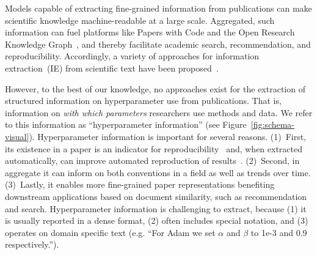 
Models capable of extracting fine-grained information from publications can make scientific knowledge machine-readable at a large scale.
Aggregated, such information can fuel platforms like Papers with Code and the Open Research Knowledge Graph~\cite{orkg1,orkg2}, and thereby facilitate academic search, recommendation,  and reproducibility.
Accordingly, a variety of approaches for information extraction~(IE) from scientific text have been proposed~\cite{luan2018scierc,Jain2020scirex,semeval21_task8,semeval22_task12,Dunn2022}.  %


However, to the best of our knowledge, no approaches exist for the extraction of structured information on hyperparameter use from publications.
That is, information on \emph{with which parameters} researchers use methods and data. We refer to this information as ``hyperparameter information'' (see Figure~\ref{fig:schema-visual}).
Hyperparameter information is important for several reasons. (1)~First, its existence in a paper is an indicator for reproducibility~\cite{Radd2019} and, when extracted automatically, can improve automated reproduction of results~\cite{sethi2018}. (2)~Second, in aggregate it can inform on both conventions in a field as well as trends over time. (3)~Lastly, it enables more fine-grained paper representations benefiting downstream applications based on document similarity, such as recommendation and search. %
Hyperparameter information is challenging to extract, because (1) it is usually reported in a dense format, (2) often includes special notation, and (3) operates on domain specific text (e.g. ``For Adam we set $\alpha$ and $\beta$ to 1e-3 and 0.9 respectively.'').

